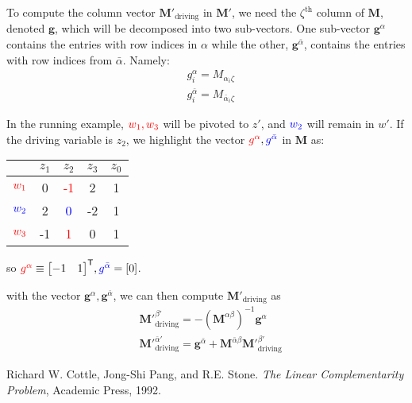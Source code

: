 \documentclass{article}
\providecommand{\tr}[1]{{#1}^{\ensuremath{\mathsf{T}}}} %
\providecommand{\vect}[1]{\bm#1}
\providecommand{\mat}[1]{\mathbf#1}
\newcommand{\1}{(\textos{1})\!}
\newcommand{\2}{(\textos{2})\!}
\newcommand{\3}{(\textos{3})\!}
\newcommand{\4}{(\textos{4})\!}
\newcommand{\5}{(\textos{5})\!}
\newcommand{\6}{(\textos{6})\!}
\newcommand{\7}{(\textos{7})\!}
\newcommand{\8}{(\textos{8})\!}
\begin{document}
To compute the column vector $\mat{M}'_{\textrm{driving}}$ in $\mat{M}'$, we
need the $\zeta^{\textrm{th}}$ column of $\mat{M}$, denoted $\vect{g}$, which
will be decomposed into two sub-vectors. One sub-vector  $\vect{g}^{\alpha}$
contains the entries with row indices in $\alpha$ while the other,  $\vect{g}^{\bar{\alpha}}$, contains the entries with row indices from $\bar{\alpha}$. Namely:
\begin{align*}
	&g^{\alpha}_i = M_{\alpha_i\zeta}\\
	&g^{\bar{\alpha}}_i = M_{\bar{\alpha}_i\zeta}
\end{align*}

In the running example, $\textcolor{red}{w_1, w_3}$ will be pivoted to $z'$, and
$\textcolor{blue}{w_2}$ will remain in $w'$. If the driving variable is $z_2$,
we highlight the vector $\textcolor{red}{g^{\alpha}},
\textcolor{blue}{g^{\bar{\alpha}}}$ in $\mat{M}$ as:
\begin{center}
\begin{tabular}{|c|cccc|}
	\hline
		& $z_1$ & $z_2$ & $z_3$ & $z_0$\\
		\hline
		$\textcolor{red}{w_1}$ & 0 & \textcolor{red}{-1} & 2 & 1\\
		$\textcolor{blue}{w_2}$ & 2 & \textcolor{blue}{0} & -2 & 1\\
		$\textcolor{red}{w_3}$ & -1 & \textcolor{red}{1} & 0 & 1\\
		\hline
\end{tabular}
\end{center}
so $\textcolor{red}{g^{\alpha}} \equiv \tr{\begin{bmatrix}-1 & 1\end{bmatrix}}, \textcolor{blue}{g^{\bar{\alpha}}} = [0]$.

with the vector $\vect{g}^{\alpha}, \vect{g}^{\bar{\alpha}}$, we can then
compute $\mat{M}'_{\textrm{driving}}$ as
\begin{align}
	&\mat{M}'^{\beta'}_{\textrm{driving}} =
    -(\mat{M}^{\alpha\beta})^{-1}\vect{g}^{\alpha} \tag{7} \\
	&\mat{M}'^{\bar{\alpha}'}_{\textrm{driving}} = \vect{g}^{\bar{\alpha}} +
    \mat{M}^{\bar{\alpha}\beta}\mat{M}'^{\beta'}_{\textrm{driving}} \tag{8}
\end{align}


\begin{thebibliography}{56}
Richard W. Cottle, Jong-Shi Pang, and R.E. Stone. \emph{The Linear
Complementarity Problem}, Academic Press, 1992.
\end{thebibliography}
\end{document}
